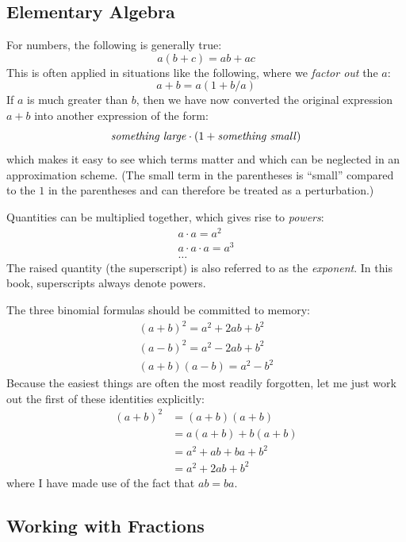 \subsection{Elementary Algebra}


For numbers, the following is generally true:
%
\[
a ( b + c ) = a b + a c
\]
%
This is often applied in situations like the following, where we
\emph{factor out} the $a$:
%
\[
a + b = a( 1 + b/a ) 
\]
%
If $a$ is much greater than $b$, then we have now converted the
original expression $a + b$ into another expression of the form:
%
\[
\text{\textit{something large}} \cdot (1 + \text{\textit{something small}})
\]
%
which makes it easy to see which terms matter and which can be
neglected in an approximation scheme. (The small term in the
parentheses is ``small'' compared to the $1$ in the parentheses and
can therefore be treated as a perturbation.)

Quantities can be multiplied together, which gives rise to
\emph{powers}:
%
\begin{gather*}
a \cdot a = a^2 \\
a \cdot a \cdot a = a^3 \\
\dots
\end{gather*}
%
The raised quantity (the superscript) is also referred to as the
\emph{exponent}. In this book, superscripts always denote powers. 

The three binomial formulas should be committed to memory:
%
\begin{gather*}
( a + b )^2 = a^2 + 2ab + b^2 \\
( a - b )^2 = a^2 - 2ab + b^2 \\
( a + b ) ( a - b ) = a^2 - b^2
\end{gather*}
%
Because the easiest things are often the most readily forgotten,
let me just work out the first of these identities explicitly:
%
\begin{align*}
( a + b )^2 
& = ( a + b ) ( a + b ) \\
& = a ( a + b ) + b ( a + b ) \\
& = a^2 + a b + b a + b^2 \\
& = a^2 + 2 a b + b^2 
\end{align*}
%
where I have made use of the fact that $a b = b a$.

\subsection{Working with Fractions}

